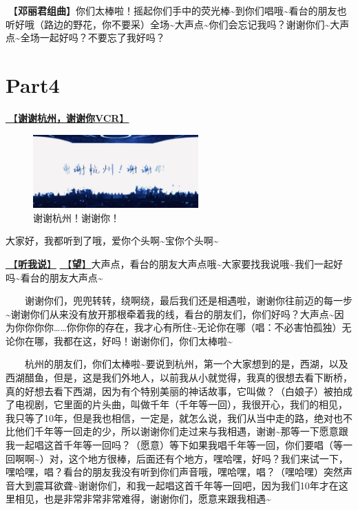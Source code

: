 \documentclass[]{ctexbook}
\begin{document}
🎵【\textbf{邓丽君组曲}】你们太棒啦！摇起你们手中的荧光棒\textasciitilde 到你们唱哦\textasciitilde 看台的朋友也听好哦（路边的野花，你不要采）全场\textasciitilde 大声点\textasciitilde 你们会忘记我吗？谢谢你们\textasciitilde 大声点\textasciitilde 全场一起好吗？不要忘了我好吗？

\section{Part4}\label{hangzhou-20240823-part4}

\hyperref[thank-you-vcr]{🎥【\textbf{谢谢杭州，谢谢你VCR}】}

\begin{figure}

{\centering \includegraphics[width=180pt]{img/hangzhou20240823/thank-hangzhou} 

}

\caption{谢谢杭州！谢谢你！}\label{fig:unnamed-chunk-76}
\end{figure}

大家好，我都听到了哦，爱你个头啊\textasciitilde 宝你个头啊\textasciitilde{}

\hyperref[listen-to-me]{🎵【\textbf{听我说}】} \hyperref[hope]{🎵【\textbf{望}】}大声点，看台的朋友大声点哦\textasciitilde 大家要找我说哦\textasciitilde 我们一起好吗\textasciitilde 看台的朋友大声点\textasciitilde{}

  谢谢你们，兜兜转转，绕啊绕，最后我们还是相遇啦，谢谢你往前迈的每一步\textasciitilde 谢谢你们从来没有放开那根牵着我的线，看台的朋友们，你们好吗？大声点\textasciitilde 因为你你你你\ldots\ldots 你你你的存在，我才心有所住\textasciitilde 无论你在哪（唱：不必害怕孤独）无论你在哪，我都在这，好吗！谢谢你们，你们太棒啦\textasciitilde{}

  杭州的朋友们，你们太棒啦\textasciitilde 要说到杭州，第一个大家想到的是，西湖，以及西湖醋鱼，但是，这是我们外地人，以前我从小就觉得，我真的很想去看下断桥，真的好想去看下西湖，因为有个特别美丽的神话故事，它叫做？（白娘子）被拍成了电视剧，它里面的片头曲，叫做千年（千年等一回），我很开心，我们的相见，我只等了10年，但是我也相信，一定是，就怎么说，我们从当中走的路，绝对也不比他们千年等一回走的少，所以谢谢你们走过来与我相遇，谢谢\textasciitilde 那等一下愿意跟我一起唱这首千年等一回吗？（愿意）等下如果我唱千年等一回，你们要唱（等一回啊啊\textasciitilde）对，这个地方很棒，后面还有个地方，嘿哈嘿，好吗？我们来试一下，嘿哈嘿，唱？看台的朋友我没有听到你们声音哦，嘿哈嘿，唱？（嘿哈嘿）突然声音大到震耳欲聋\textasciitilde 谢谢你们，和我一起唱这首千年等一回吧，因为我们10年才在这里相见，也是非常非常非常难得，谢谢你们，愿意来跟我相遇\textasciitilde{}
\end{document}
